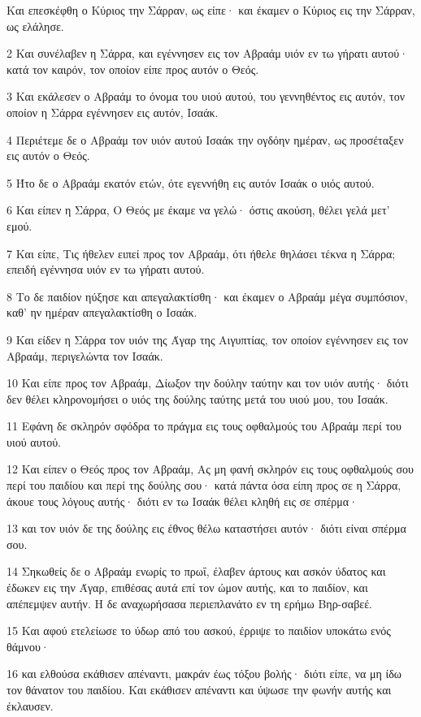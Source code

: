 \par Και επεσκέφθη ο Κύριος την Σάρραν, ως είπε· και έκαμεν ο Κύριος εις την Σάρραν, ως ελάλησε.
\par 2 Και συνέλαβεν η Σάρρα, και εγέννησεν εις τον Αβραάμ υιόν εν τω γήρατι αυτού· κατά τον καιρόν, τον οποίον είπε προς αυτόν ο Θεός.
\par 3 Και εκάλεσεν ο Αβραάμ το όνομα του υιού αυτού, του γεννηθέντος εις αυτόν, τον οποίον η Σάρρα εγέννησεν εις αυτόν, Ισαάκ.
\par 4 Περιέτεμε δε ο Αβραάμ τον υιόν αυτού Ισαάκ την ογδόην ημέραν, ως προσέταξεν εις αυτόν ο Θεός.
\par 5 Ήτο δε ο Αβραάμ εκατόν ετών, ότε εγεννήθη εις αυτόν Ισαάκ ο υιός αυτού.
\par 6 Και είπεν η Σάρρα, Ο Θεός με έκαμε να γελώ· όστις ακούση, θέλει γελά μετ' εμού.
\par 7 Και είπε, Τις ήθελεν ειπεί προς τον Αβραάμ, ότι ήθελε θηλάσει τέκνα η Σάρρα; επειδή εγέννησα υιόν εν τω γήρατι αυτού.
\par 8 Το δε παιδίον ηύξησε και απεγαλακτίσθη· και έκαμεν ο Αβραάμ μέγα συμπόσιον, καθ' ην ημέραν απεγαλακτίσθη ο Ισαάκ.
\par 9 Και είδεν η Σάρρα τον υιόν της Άγαρ της Αιγυπτίας, τον οποίον εγέννησεν εις τον Αβραάμ, περιγελώντα τον Ισαάκ.
\par 10 Και είπε προς τον Αβραάμ, Δίωξον την δούλην ταύτην και τον υιόν αυτής· διότι δεν θέλει κληρονομήσει ο υιός της δούλης ταύτης μετά του υιού μου, του Ισαάκ.
\par 11 Εφάνη δε σκληρόν σφόδρα το πράγμα εις τους οφθαλμούς του Αβραάμ περί του υιού αυτού.
\par 12 Και είπεν ο Θεός προς τον Αβραάμ, Ας μη φανή σκληρόν εις τους οφθαλμούς σου περί του παιδίου και περί της δούλης σου· κατά πάντα όσα είπη προς σε η Σάρρα, άκουε τους λόγους αυτής· διότι εν τω Ισαάκ θέλει κληθή εις σε σπέρμα·
\par 13 και τον υιόν δε της δούλης εις έθνος θέλω καταστήσει αυτόν· διότι είναι σπέρμα σου.
\par 14 Σηκωθείς δε ο Αβραάμ ενωρίς το πρωΐ, έλαβεν άρτους και ασκόν ύδατος και έδωκεν εις την Άγαρ, επιθέσας αυτά επί τον ώμον αυτής, και το παιδίον, και απέπεμψεν αυτήν. Η δε αναχωρήσασα περιεπλανάτο εν τη ερήμω Βηρ-σαβεέ.
\par 15 Και αφού ετελείωσε το ύδωρ από του ασκού, έρριψε το παιδίον υποκάτω ενός θάμνου·
\par 16 και ελθούσα εκάθισεν απέναντι, μακράν έως τόξου βολής· διότι είπε, να μη ίδω τον θάνατον του παιδίου. Και εκάθισεν απέναντι και ύψωσε την φωνήν αυτής και έκλαυσεν.
